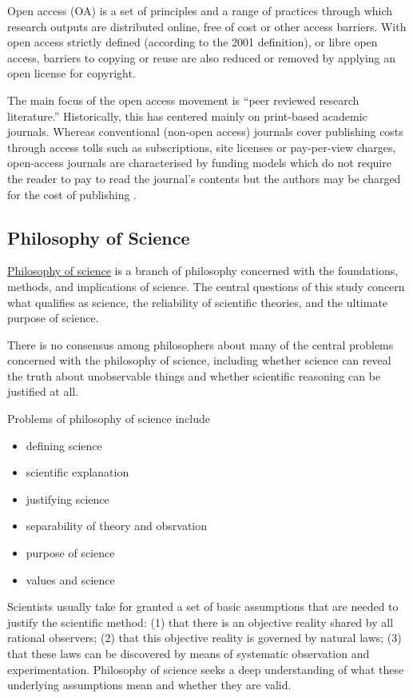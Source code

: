 \documentclass[
]{article}
\providecommand{\tightlist}{%
  \setlength{\itemsep}{0pt}\setlength{\parskip}{0pt}}
\begin{document}
Open access (OA) is a set of principles and a range of practices through
which research outputs are distributed online, free of cost or other
access barriers. With open access strictly defined (according to the
2001 definition), or libre open access, barriers to copying or reuse are
also reduced or removed by applying an open license for copyright.

The main focus of the open access movement is ``peer reviewed research
literature.'' Historically, this has centered mainly on print-based
academic journals. Whereas conventional (non-open access) journals cover
publishing costs through access tolls such as subscriptions, site
licenses or pay-per-view charges, open-access journals are characterised
by funding models which do not require the reader to pay to read the
journal's contents but the authors may be charged for the cost of
publishing .

\hypertarget{philosophy-of-science}{%
\subsection{Philosophy of Science}\label{philosophy-of-science}}

\href{https://en.wikipedia.org/wiki/Philosophy_of_science}{Philosophy of
science} is a branch of philosophy concerned with the foundations,
methods, and implications of science. The central questions of this
study concern what qualifies as science, the reliability of scientific
theories, and the ultimate purpose of science.

There is no consensus among philosophers about many of the central
problems concerned with the philosophy of science, including whether
science can reveal the truth about unobservable things and whether
scientific reasoning can be justified at all.

Problems of philosophy of science include

\begin{itemize}
\tightlist
\item
  defining science
\item
  scientific explanation
\item
  justifying science
\item
  separability of theory and obsrvation
\item
  purpose of science
\item
  values and science
\end{itemize}

Scientists usually take for granted a set of basic assumptions that are
needed to justify the scientific method: (1) that there is an objective
reality shared by all rational observers; (2) that this objective
reality is governed by natural laws; (3) that these laws can be
discovered by means of systematic observation and experimentation.
Philosophy of science seeks a deep understanding of what these
underlying assumptions mean and whether they are valid.
\end{document}
